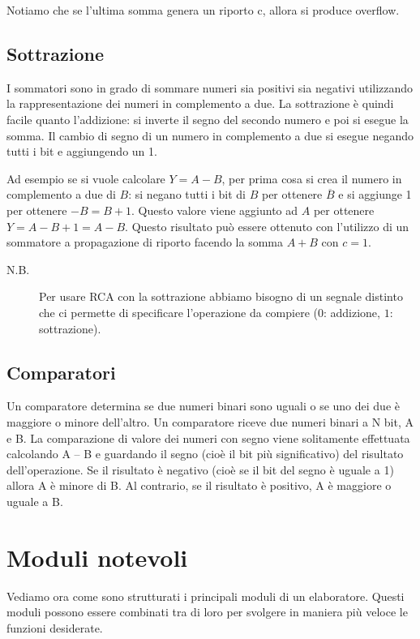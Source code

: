 Notiamo che se l'ultima somma genera un riporto c, allora si produce overflow. 

\subsection{Sottrazione}
I sommatori sono in grado di sommare numeri sia positivi sia negativi utilizzando la rappresentazione dei numeri in complemento a due. La sottrazione è quindi facile quanto l’addizione: si inverte il segno del secondo numero e poi si esegue la somma. Il cambio di segno di un numero in complemento a due si esegue negando tutti i bit e aggiungendo un 1.

Ad esempio se si vuole calcolare $Y = A - B$, per prima cosa si crea il numero in complemento a due di $B$: si negano tutti i bit di $B$ per ottenere $\overline{B}$ e si aggiunge 1 per ottenere $-B = B + 1$. Questo valore viene aggiunto ad $A$ per ottenere $Y=A-B+1=A-B$. Questo risultato può essere ottenuto con l’utilizzo di un sommatore a propagazione di riporto facendo la somma $A + B$ con $c = 1$.

\begin{description}
    \item[N.B.] Per usare RCA con la sottrazione abbiamo bisogno di un segnale distinto che ci permette di specificare l'operazione da compiere ($0$: addizione, $1$: sottrazione).
\end{description}

\subsection{Comparatori}
Un comparatore determina se due numeri binari sono uguali o se uno dei due è maggiore o minore dell’altro. Un comparatore riceve due numeri binari a N bit, A e B. La comparazione di valore dei numeri con segno viene solitamente effettuata calcolando A – B e guardando il segno (cioè il bit più significativo) del risultato dell’operazione. Se il risultato è negativo (cioè se il bit del segno è uguale a 1) allora A è minore di B. Al contrario, se il risultato è positivo, A è maggiore o uguale a B.

\section{Moduli notevoli}
Vediamo ora come sono strutturati i principali moduli di un elaboratore. Questi moduli possono essere combinati tra di loro per svolgere in maniera più veloce le funzioni desiderate.

